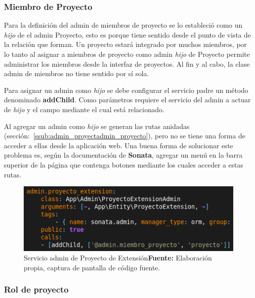 \documentclass{article}
\begin{document}
\subsubsection{Miembro de Proyecto}%
\label{ssub:miembro_de_proyecto_admin}
Para la definición del admin de miembros de proyecto se lo estableció como un \textit{hijo} de el admin Proyecto, esto es porque tiene sentido desde el punto de vista
de la relación que forman. Un proyecto estará integrado por muchos miembros, por lo tanto al asignar a miembros de proyecto como admin \textit{hijo} de Proyecto permite
administrar los miembros desde la interfaz de proyectos. Al fin y al cabo, la clase admin de miembros no tiene sentido por sí sola.

Para asignar un admin como \textit{hijo} se debe configurar el servicio padre un método denominado \textbf{addChild}. Como parámetros requiere el servicio del admin
a actuar de \textit{hijo} y el campo mediante el cual está relacionado.


Al agregar un admin como \textit{hijo} se generan las rutas anidadas (sección:~\ref{ssub:admin_proyectadmin_proyecto}), pero no se tiene una forma de acceder a
ellas desde la aplicación web\@. Una buena forma de solucionar este problema es, según la documentación de \textbf{Sonata}, agregar un menú en la barra superior
de la página que contenga botones mediante los cuales acceder a estas rutas.\textcite{sonata-childAdmin}

\begin{figure}[h]
    \includegraphics[width=1\linewidth]{image/addChild.png}
    \caption{Servicio admin de Proyecto de Extensión\newline \textbf{Fuente:} Elaboración propia, captura de pantalla de código fuente.}
    \label{fig:image/addChild}
\end{figure}

\newpage
\subsubsection{Rol de proyecto}%
\label{ssub:rol_de_proyecto_admin}
\end{document}

